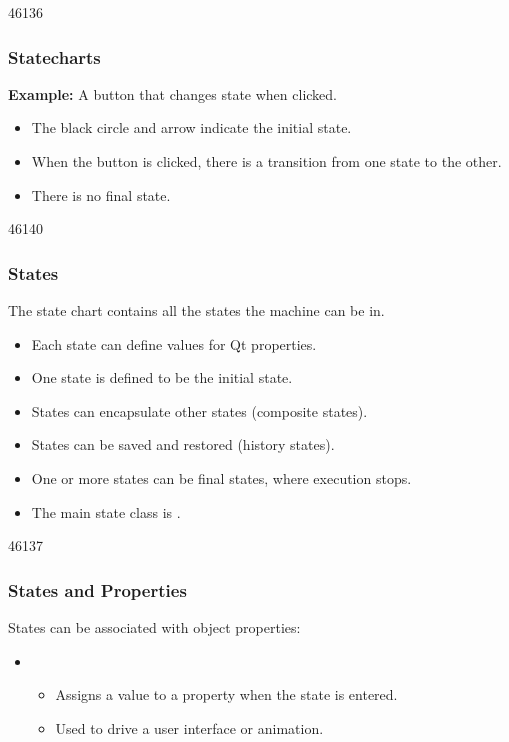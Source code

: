 \begin{slide}{46136}\frametitle{Statecharts}
\textbf{Example:} A button that changes state when clicked.

\vspace*{1.5em}
\vspace*{1.5em}

\begin{itemize}
\item The black circle and arrow indicate the initial state.
\item When the button is clicked, there is a transition from one state to
the other.
\item There is no final state.
\end{itemize}
\end{slide}

\begin{slide}{46140}\frametitle{States}
\label{Animation-States-States}
\vspace*{1.0em}
The state chart contains all the states the machine can be in.

\begin{itemize}
\item Each state can define values for Qt properties.
\item One state is defined to be the initial state.
\item States can encapsulate other states (composite states).
\item States can be saved and restored (history states).
\item One or more states can be final states, where execution stops.
\item The main state class is .
\end{itemize}
\end{slide}

\begin{slide}[fragile]{46137}\frametitle{States and Properties}
\label{Animation-States-Properties}
\vspace*{1.0em}
States can be associated with object properties:

\vspace*{1.5em}
\vspace*{1.0em}

\begin{itemize}
\item {}
\begin{itemize}
\item Assigns a value to a property when the state is entered.
\item Used to drive a user interface or animation.
\end{itemize}
\end{itemize}
\end{slide}

